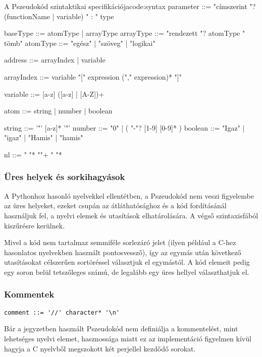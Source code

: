\begin{code}{A Pszeudokód szintaktikai specifikációja}{code:syntax}
parameter ::= "címszerint "? (functionName | variable) " : " type

baseType ::= atomType | arrayType
arrayType ::= "rendezett "? atomType " tömb"
atomType ::= "egész" | "szöveg" | "logikai"

address ::= arrayIndex | variable

arrayIndex ::= variable "[" expression ("," expression)* "]"

variable ::= [a-z] ([a-z] | [A-Z])+

atom ::= string | number | boolean

string ::= '"' [a-z]* '"'
number ::= "0" | ( "-"? [1-9] [0-9]* )
boolean ::= "Igaz" | "igaz" | "Hamis" | "hamis"

nl ::= " "* "\n"+ " "*

\end{code}
\fi

\subsubsection{Üres helyek és sorkihagyások}

A Pythonhoz hasonló nyelvekkel ellentétben, a Pszeudokód nem veszi figyelembe az üres helyeket, ezeket csupán az átláthatósághoz és a kód fordításánál használjuk fel, a nyelvi elemek és utasítások elhatárolására. A végső szintaxisfából kiszűrésre kerülnek.

Mivel a kód nem tartalmaz semmiféle sorlezáró jelet (ilyen például a C-hez hasonlatos nyelvekben használt pontosvessző), így az egymás után következő utasításokat célszerűen sortöréssel választjuk el egymástól. A kód elemeit pedig egy soron belül tetszőleges számú, de legalább egy üres hellyel választhatjuk el.

\subsubsection{Kommentek}

\begin{footnotesize}
\begin{verbatim}
comment ::= '//' character* '\n'
\end{verbatim}
\end{footnotesize}

Bár a jegyzetben használt Pszeudokód nem definiálja a kommentelést, mint lehetséges nyelvi elemet, hasznossága miatt ez az implementáció figyelmen kívül hagyja a C nyelvből megszokott két perjellel kezdődő sorokat.

